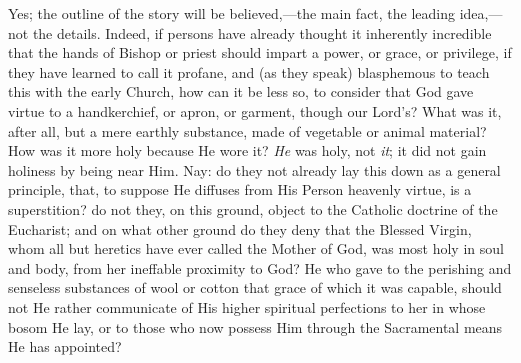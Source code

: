 Yes; the outline of the story will be believed,—the main fact,
the leading idea,—not the details. Indeed, if persons have already
thought it inherently incredible that the hands of Bishop or priest
should impart a power, or grace, or privilege, if they have learned to
call it profane, and (as they speak) blasphemous to teach this with
the early Church, how can it be less so, to consider that God gave
virtue to a handkerchief, or apron, or garment, though our Lord's?
What was it, after all, but a mere earthly substance, made of
vegetable or animal material? How was it more holy because He wore it?
\emph{He} was holy, not \emph{it}; it did not gain holiness by being
near Him. Nay: do they not already lay this down as a general
principle, that, to suppose He diffuses from His Person heavenly
virtue, is a superstition? do not they, on this ground, object to the
Catholic doctrine of the Eucharist; and on what other ground do they
deny that the Blessed Virgin, whom all but heretics have ever called
the Mother of God, was most holy in soul and body, from her ineffable
proximity to God? He who gave to the perishing and senseless
substances of wool or cotton that grace of which it was capable,
should not He rather communicate of His higher spiritual perfections
to her in whose bosom He lay, or to those who now possess Him
through the Sacramental means He has appointed?

